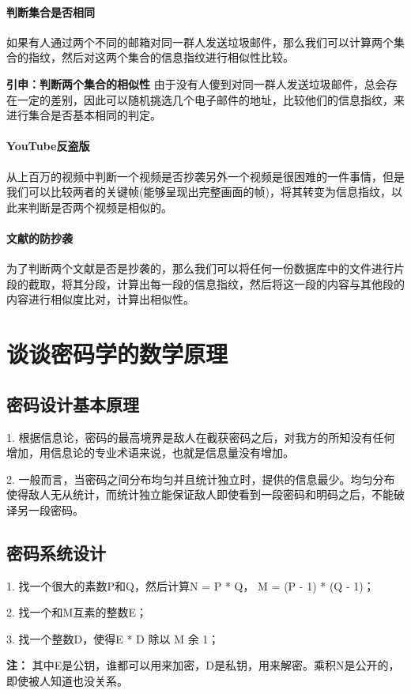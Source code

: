 \documentclass[UTF8]{article}
\begin{document}
	\paragraph{判断集合是否相同}
	如果有人通过两个不同的邮箱对同一群人发送垃圾邮件，那么我们可以计算两个集合的指纹，然后对这两个集合的信息指纹进行相似性比较。

	\textbf{引申：判断两个集合的相似性}
	由于没有人傻到对同一群人发送垃圾邮件，总会存在一定的差别，因此可以随机挑选几个电子邮件的地址，比较他们的信息指纹，来进行集合是否基本相同的判定。

	\paragraph{YouTube反盗版}
	从上百万的视频中判断一个视频是否抄袭另外一个视频是很困难的一件事情，但是我们可以比较两者的关键帧(能够呈现出完整画面的帧)，将其转变为信息指纹，以此来判断是否两个视频是相似的。

	\paragraph{文献的防抄袭}
	为了判断两个文献是否是抄袭的，那么我们可以将任何一份数据库中的文件进行片段的截取，将其分段，计算出每一段的信息指纹，然后将这一段的内容与其他段的内容进行相似度比对，计算出相似性。

	\section{谈谈密码学的数学原理}
	\subsection{密码设计基本原理}
	1. 根据信息论，密码的最高境界是敌人在截获密码之后，对我方的所知没有任何增加，用信息论的专业术语来说，也就是信息量没有增加。

	2. 一般而言，当密码之间分布均匀并且统计独立时，提供的信息最少。均匀分布使得敌人无从统计，而统计独立能保证敌人即使看到一段密码和明码之后，不能破译另一段密码。

	\subsection{密码系统设计}
	1. 找一个很大的素数P和Q，然后计算N = P * Q， M = (P - 1) * (Q - 1)；

	2. 找一个和M互素的整数E；

	3. 找一个整数D，使得E * D 除以 M 余 1；

	\textbf{注：} 其中E是公钥，谁都可以用来加密，D是私钥，用来解密。乘积N是公开的，即使被人知道也没关系。
\end{document}
